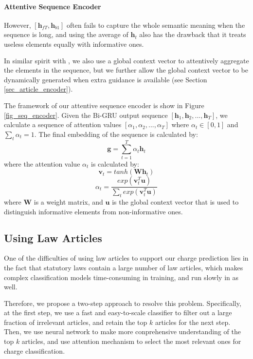\paragraph{Attentive Sequence Encoder}
\label{sec_att_seq_encoder}
However, $[\mathbf{h}_{fT}, \mathbf{h}_{b1}]$ often fails to capture the whole semantic meaning when the sequence is long, and using the average of $\mathbf{h}_t$ also has the drawback that it treats useless elements equally with informative ones. 

In similar spirit with \cite{yang2016hierarchical}, we also use a global context vector to attentively aggregate the elements in the sequence, but we further allow the global context vector to be dynamically generated when extra guidance is available (see Section \ref{sec_article_encoder}).


The framework of our attentive sequence encoder is show in Figure \ref{fig_seq_encoder}. Given the Bi-GRU output sequence $[\mathbf{h}_1, \mathbf{h}_2, ..., \mathbf{h}_T]$, we calculate a sequence of attention values $[\alpha_1, \alpha_2, ..., \alpha_T]$ where $\alpha_t \in [0, 1]$ and $\sum_t{\alpha_t}=1$. The final embedding of the sequence is calculated by:
\begin{equation}
\mathbf{g} = \sum_{t=1}^{T}{\alpha_t \mathbf{h}_t}
\label{seq_embed}
\end{equation}
where the attention value $\alpha_t$ is calculated by:
\begin{equation}
\mathbf{v}_t = tanh(\mathbf{W} \mathbf{h}_t)
\label{eq_att_transform}
\end{equation}
\begin{equation}
\alpha_t=\frac{exp(\mathbf{v}_t^T \mathbf{u})}{\sum_t{exp(\mathbf{v}_t^T \mathbf{u})}}
\label{gen_att}
\end{equation}
where $\mathbf{W}$ is a weight matrix, and $\mathbf{u}$ is the global context vector that is used to distinguish informative elements from non-informative ones. 


\subsection{Using Law Articles}
One of the difficulties of using law articles to support our charge prediction lies in the fact that statutory laws contain a large number of law articles, which makes complex classification models time-consuming in training, and run slowly in  as well. 

Therefore, we propose a two-step approach to resolve this problem. Specifically, at the first step, we use a fast and easy-to-scale classifier to filter out a large fraction of irrelevant articles, and retain the top $k$ articles for the next step. Then, we use neural network to make more conprehensive understanding of the top $k$ articles, and use attention mechanism to select the most relevant ones for charge classification.

